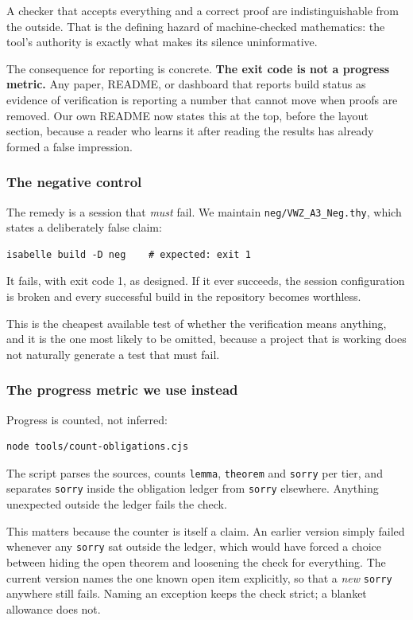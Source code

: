 A checker that accepts everything and a correct proof are indistinguishable from
the outside. That is the defining hazard of machine-checked mathematics: the
tool's authority is exactly what makes its silence uninformative.

The consequence for reporting is concrete. \textbf{The exit code is not a
progress metric.} Any paper, README, or dashboard that reports build status as
evidence of verification is reporting a number that cannot move when proofs are
removed. Our own README now states this at the top, before the layout section,
because a reader who learns it after reading the results has already formed a
false impression.

\subsubsection{The negative control}

The remedy is a session that \emph{must} fail. We maintain
\texttt{neg/VWZ\_A3\_Neg.thy}, which states a deliberately false claim:

\begin{lstlisting}
isabelle build -D neg    # expected: exit 1
\end{lstlisting}

It fails, with exit code 1, as designed. If it ever succeeds, the session
configuration is broken and every successful build in the repository becomes
worthless.

This is the cheapest available test of whether the verification means anything,
and it is the one most likely to be omitted, because a project that is working
does not naturally generate a test that must fail.

\subsubsection{The progress metric we use instead}

Progress is counted, not inferred:

\begin{lstlisting}
node tools/count-obligations.cjs
\end{lstlisting}

The script parses the sources, counts \texttt{lemma}, \texttt{theorem} and
\texttt{sorry} per tier, and separates \texttt{sorry} inside the obligation
ledger from \texttt{sorry} elsewhere. Anything unexpected outside the ledger
fails the check.

This matters because the counter is itself a claim. An earlier version simply
failed whenever any \texttt{sorry} sat outside the ledger, which would have
forced a choice between hiding the open theorem and loosening the check for
everything. The current version names the one known open item explicitly, so
that a \emph{new} \texttt{sorry} anywhere still fails. Naming an exception keeps
the check strict; a blanket allowance does not.

